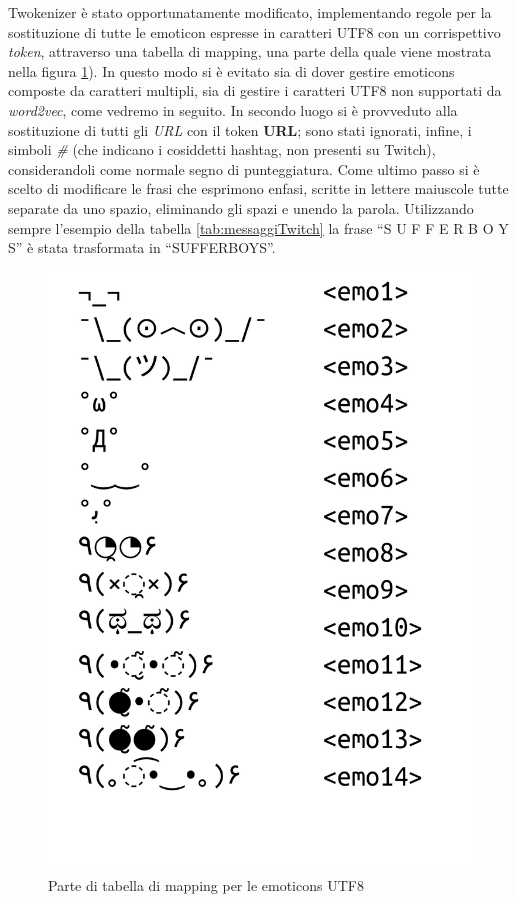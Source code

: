 \documentclass[a4paper,12pt,openright,twoside]{report}
\theoremstyle{definition}
\begin{document}
Twokenizer è stato opportunatamente
modificato, implementando regole per la sostituzione di tutte le emoticon espresse in caratteri UTF8 con un corrispettivo \emph{token},
attraverso una tabella di mapping, una parte della quale viene mostrata nella figura \ref{fig:mappingEmo}). In
questo modo si è evitato sia di dover gestire emoticons composte da caratteri multipli, sia di gestire
i caratteri UTF8 non supportati da \emph{word2vec}, come vedremo in seguito.
In secondo luogo si è provveduto alla sostituzione di tutti gli \emph{URL} con il token \textbf{URL};
sono stati ignorati, infine,
i simboli \emph{\#} (che indicano i cosiddetti hashtag, non presenti su Twitch),
considerandoli come normale segno di punteggiatura.
Come ultimo passo si è scelto di modificare le frasi che esprimono enfasi, scritte in lettere maiuscole
tutte separate da uno spazio, eliminando gli spazi e unendo la parola. Utilizzando sempre l'esempio 
della tabella \ref{tab:messaggiTwitch} la frase ``S U F F E R B O Y S'' è stata trasformata in ``SUFFERBOYS''.
\begin{figure}[h]
	\centering
	\includegraphics[scale=0.3]{Immagini/emoticonsTable.pdf}
	\caption{Parte di tabella di mapping per le emoticons UTF8}
	\label{fig:mappingEmo}
\end{figure}
\end{document}
